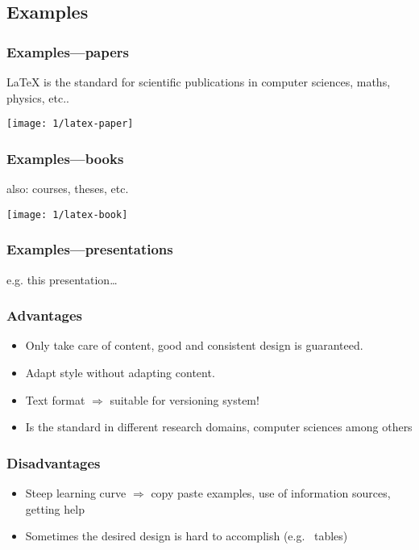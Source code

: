 \documentclass[aspectratio=169]{beamer}
\begin{document}
\subsection{Examples}

\begin{frame}
  \frametitle{Examples---papers}

  {\LaTeX} is the standard for scientific publications in computer sciences, maths, physics, etc..

  \begin{center}
    \texttt{[image: 1/latex-paper]}
  \end{center}

\end{frame}

\begin{frame}
  \frametitle{Examples---books}

  also: courses, theses, etc. 

  \begin{center}
    \texttt{[image: 1/latex-book]}
  \end{center}

\end{frame}

\begin{frame}
  \frametitle{Examples---presentations}

  \begin{center}
    e.g. this presentation\ldots
  \end{center}

\end{frame}

\begin{frame}
  \frametitle{Advantages}

  \begin{itemize}
    \item<+-> Only take care of content, good and consistent design is guaranteed.
    \item<+-> Adapt style without adapting content.
    \item<+-> Text format \(\Rightarrow\) suitable for versioning system!
    \item<+-> Is the standard in different research domains, computer sciences among others
  \end{itemize}
\end{frame}


\begin{frame}
  \frametitle{Disadvantages}

  \begin{itemize}
    \item<+-> Steep learning curve \(\Rightarrow\) copy paste examples, use of information sources, getting help
    \item<+-> Sometimes the desired design is hard to accomplish (e.g. ~tables)
  \end{itemize}

\end{frame}
\end{document}
